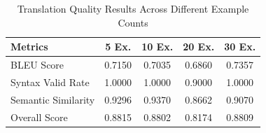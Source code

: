 \documentclass[11pt,a4paper]{article}
\begin{document}
\begin{table}[htbp]
    \small  %
    \centering
    \caption{Translation Quality Results Across Different Example Counts}
    \begin{tabular}{|l|c|c|c|c|}
    \hline
    \textbf{Metrics} & \textbf{5 Ex.} & \textbf{10 Ex.} & \textbf{20 Ex.} & \textbf{30 Ex.} \\
    \hline
    BLEU Score & 0.7150 & 0.7035 & 0.6860 & 0.7357 \\
    \hline
    Syntax Valid Rate & 1.0000 & 1.0000 & 0.9000 & 1.0000 \\
    \hline
    Semantic Similarity & 0.9296 & 0.9370 & 0.8662 & 0.9070 \\
    \hline
    Overall Score & 0.8815 & 0.8802 & 0.8174 & 0.8809 \\
    \hline
    \end{tabular}
    \label{tab:translation-results}
    \end{table}
\end{document}
